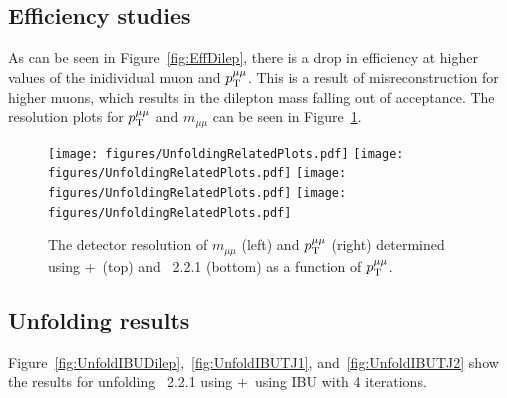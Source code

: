 \subsection{Efficiency studies}

As can be seen in Figure~\ref{fig:EffDilep}, there is a drop in efficiency at higher values of the inidividual muon \pt and $p_\mathrm{T}^{\mu\mu}$. This is a result of \pt misreconstruction for higher \pt muons, which results in the dilepton mass falling out of acceptance.
The resolution plots for $p_\mathrm{T}^{\mu\mu}$ and $m_{\mu\mu}$ can be seen in Figure~\ref{fig:Resmll}.

\begin{figure}
  \centering
  \texttt{[image: figures/UnfoldingRelatedPlots.pdf]}
  \texttt{[image: figures/UnfoldingRelatedPlots.pdf]}
  \texttt{[image: figures/UnfoldingRelatedPlots.pdf]}
  \texttt{[image: figures/UnfoldingRelatedPlots.pdf]}
  \caption{The detector resolution of $m_{\mu\mu}$ (left) and $p_\mathrm{T}^{\mu\mu}$ (right) determined using \powheg+\pythia~(top) and \sherpa~2.2.1 (bottom) as a function of $p_\mathrm{T}^{\mu\mu}$.}
  \label{fig:Resmll}
\end{figure}

\subsection{Unfolding results}
Figure~\ref{fig:UnfoldIBUDilep},~\ref{fig:UnfoldIBUTJ1}, and~\ref{fig:UnfoldIBUTJ2} show the results for unfolding \sherpa~2.2.1 using \powheg+\pythia~using IBU with 4 iterations.

